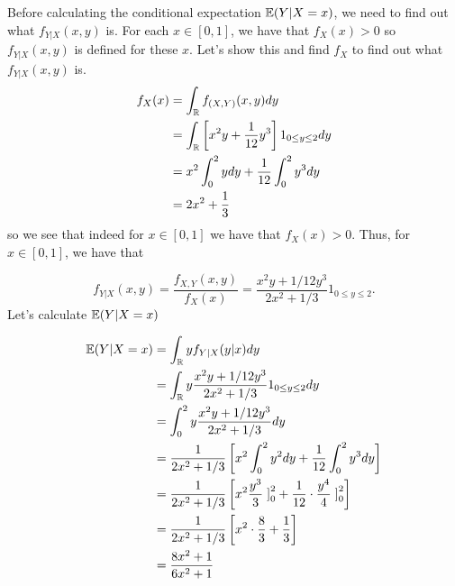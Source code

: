 
Before calculating the conditional expectation $ \mathbb{E}(Y |X = x)$, we need to find out what $ f_{Y|X}
(x,y)$ is. 
For each $ x \in [0,1]$, we have that $ f_{X} (x) > 0$ so $ f_{Y|X} (x,y)$ is defined for these $
x$. Let's show this and  find $ f_{X} $ to find out what $ f_{Y|X} (x,y)$ is.
\begin{align*}
    f_{X} (x) &= \int_{\mathbb{R}} f_{(X,Y)} (x,y) dy \\
	      &= \int_{\mathbb{R}} \left[ x^2 y + \frac{1}{12} y^{3}  \right] 1_{0 \leq y \leq 2} dy\\
	      &= x^2 \int_{0}^{2} ydy + \frac{1}{12} \int_{0}^{2} y^{3} dy\\
	      &= 2x^2 + \frac{1}{3}
\end{align*}
so we see that indeed for $ x \in [0,1]$ we have that $ f_{X} (x) > 0$.
Thus, for $ x \in [0,1]	$, we have that

\[
    f_{Y|X} (x,y) = \frac{f_{X,Y} (x,y)}{f_{X} (x)} = \frac{x^2y + 1/12 y^{3} }{2x^2 + 1/3}  1_{0 \leq y \leq 2} 
.\] 
Let's calculate $ \mathbb{E}(Y|X = x)$

\begin{align*}
    \mathbb{E}(Y|X = x) &= \int_{\mathbb{R}} y f_{Y|X} (y|x) dy\\
		&= \int_{\mathbb{R}} y \frac{x^2 y + 1/12 y^{3} }{2x^2 + 1/3} 1_{0 \leq y \leq 2} dy\\
		&= \int_{0}^{2} y \frac{x^2 y + 1/12 y^{3} }{2x^2 + 1/3} dy\\
		&= \frac{1}{2x^2 + 1/3} \left[ x^2 \int_{0}^{2} y^2 dy + \frac{1}{12} \int_{0}^{2}
		y^{3} dy  \right] \\
		&= \frac{1}{2x^2 + 1/3} \left[ x^2 \frac{y^{3} }{3}\left. \right]_{0}^{2} +
		\frac{1}{12} \cdot \frac{y^{4} }{4}\left. \right]_{0}^{2}  \right] \\
		&= \frac{1}{2x^2 + 1/3} \left[ x^2 \cdot \frac{8}{3} + \frac{1}{3}  \right] \\
		&= \frac{8x^2 + 1 }{6x^2 +1} 
\end{align*}
